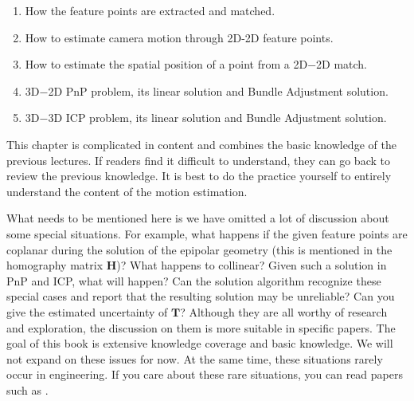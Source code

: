 \begin{enumerate}
	\item How the feature points are extracted and matched.
	\item How to estimate camera motion through 2D-2D feature points.
	\item How to estimate the spatial position of a point from a 2D−2D match.
	\item 3D−2D PnP problem, its linear solution and Bundle Adjustment solution.
	\item 3D−3D ICP problem, its linear solution and Bundle Adjustment solution.
\end{enumerate}

This chapter is complicated in content and combines the basic knowledge of the previous lectures. If readers find it difficult to understand, they can go back to review the previous knowledge. It is best to do the practice yourself to entirely understand the content of the motion estimation.

What needs to be mentioned here is we have omitted a lot of discussion about some special situations. For example, what happens if the given feature points are coplanar during the solution of the epipolar geometry (this is mentioned in the homography matrix $\bm{H}$)? What happens to collinear? Given such a solution in PnP and ICP, what will happen? Can the solution algorithm recognize these special cases and report that the resulting solution may be unreliable? Can you give the estimated uncertainty of $\bm{T}$? Although they are all worthy of research and exploration, the discussion on them is more suitable in specific papers. The goal of this book is extensive knowledge coverage and basic knowledge. We will not expand on these issues for now. At the same time, these situations rarely occur in engineering. If you care about these rare situations, you can read papers such as \cite{Hartley2003}.

